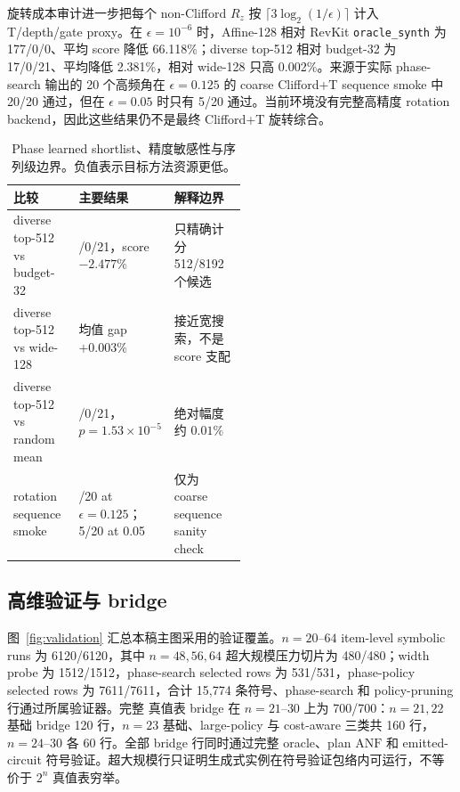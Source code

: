 \documentclass[UTF8,fontset=macnew,11pt]{ctexart}
\newcommand{\anf}{\ensuremath{\mathrm{ANF}}}
\newcommand{\rz}{\ensuremath{R_z}}
\newcommand{\ttable}{真值表}
\begin{document}
旋转成本审计进一步把每个 non-Clifford \rz{} 按 $\lceil3\log_2(1/\epsilon)\rceil$ 计入 T/depth/gate proxy。在 $\epsilon=10^{-6}$ 时，Affine-128 相对 RevKit \texttt{oracle\_synth} 为 177/0/0、平均 score 降低 66.118\%；diverse top-512 相对 budget-32 为 17/0/21、平均降低 2.381\%，相对 wide-128 只高 0.002\%。来源于实际 phase-search 输出的 20 个高频角在 $\epsilon=0.125$ 的 coarse Clifford+T sequence smoke 中 20/20 通过，但在 $\epsilon=0.05$ 时只有 5/20 通过。当前环境没有完整高精度 rotation backend，因此这些结果仍不是最终 Clifford+T 旋转综合。

\begin{table}[H]
\centering
\small
\setlength{\tabcolsep}{3pt}
\caption{Phase learned shortlist、精度敏感性与序列级边界。负值表示目标方法资源更低。}
\label{tab:phase-policy}
\begin{tabularx}{\linewidth}{>{\raggedright\arraybackslash}p{0.28\linewidth}>{\raggedright\arraybackslash}p{0.24\linewidth}>{\raggedright\arraybackslash}X}
\toprule
比较 & 主要结果 & 解释边界 \\
\midrule
diverse top-512 vs budget-32 & 17/0/21，score $-2.477\%$ & 只精确计分 512/8192 个候选 \\
diverse top-512 vs wide-128 & 均值 gap $+0.003\%$ & 接近宽搜索，不是 score 支配 \\
diverse top-512 vs random mean & 17/0/21，$p=1.53\times10^{-5}$ & 绝对幅度约 $0.01\%$ \\
rotation sequence smoke & 20/20 at $\epsilon=0.125$；5/20 at 0.05 & 仅为 coarse sequence sanity check \\
\bottomrule
\end{tabularx}
\end{table}

\subsection{高维验证与 bridge}

图~\ref{fig:validation} 汇总本稿主图采用的验证覆盖。$n=20$--$64$ item-level symbolic runs 为 6120/6120，其中 $n=48,56,64$ 超大规模压力切片为 480/480；width probe 为 1512/1512，phase-search selected rows 为 531/531，phase-policy selected rows 为 7611/7611，合计 15,774 条符号、phase-search 和 policy-pruning 行通过所属验证器。完整 \ttable{} bridge 在 $n=21$--$30$ 上为 700/700：$n=21,22$ 基础 bridge 120 行，$n=23$ 基础、large-policy 与 cost-aware 三类共 160 行，$n=24$--$30$ 各 60 行。全部 bridge 行同时通过完整 oracle、plan \anf{} 和 emitted-circuit 符号验证。超大规模行只证明生成式实例在符号验证包络内可运行，不等价于 $2^n$ 真值表穷举。
\end{document}
